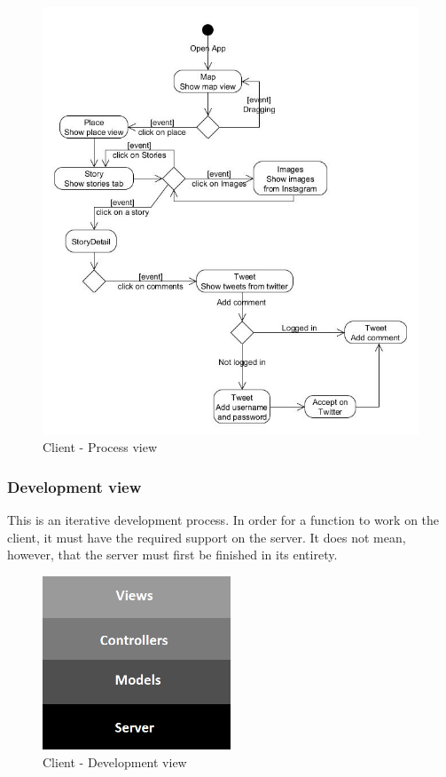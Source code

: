 \documentclass[11pt]{book}
\begin{document}
\begin{figure}[H]
      \centering
      \includegraphics[width=1.0\textwidth]{Figures/Architecture/clientProcess.jpg}
      \caption{Client - Process view}
      \label{fig:arch_client_process}
\end{figure}

\subsubsection{Development view}
This is an iterative development process. In order for a function to work on the client, it must have the required support on the server. It does not mean, however, that the server must first be finished in its entirety.

\begin{figure}[H]
      \centering
      \includegraphics[width=0.5\textwidth]{Figures/Architecture/clientDevelopmentView.png}
      \caption{Client - Development view}
      \label{fig:arch_client_development}
\end{figure}
\end{document}

